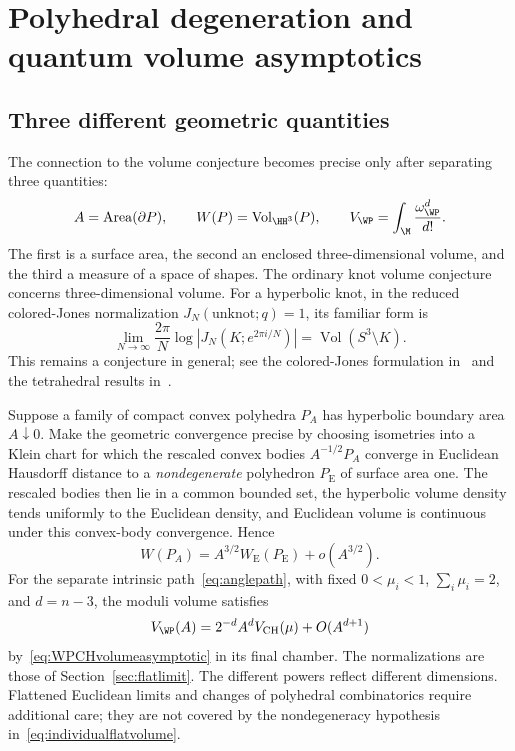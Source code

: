 \section{Polyhedral degeneration and quantum volume asymptotics}
\label{sec:quantumdegeneration}

\subsection{Three different geometric quantities}

The connection to the volume conjecture becomes precise only after
separating three quantities:
\[
 A=\operatorname{Area}(\partial P),\qquad
 W(P)=\operatorname{Vol}_{\HH^3}(P),\qquad
 V_{\WP}=\int_{\M}\frac{\omega_{\WP}^d}{d!}.
\]
The first is a surface area, the second an enclosed three-dimensional
volume, and the third a measure of a space of shapes. The ordinary
knot volume conjecture concerns three-dimensional volume. For a
hyperbolic knot, in the reduced colored-Jones normalization
$J_N(\text{unknot};q)=1$, its familiar form is
\begin{equation}
 \lim_{N\to\infty}\frac{2\pi}{N}
 \log\left|J_N(K;e^{2\pi i/N})\right|
 =\operatorname{Vol}(S^3\setminus K).
 \label{eq:volumeconjecture}
\end{equation}
This remains a conjecture in general; see the colored-Jones
formulation in~\cite{MurakamiMurakami} and the tetrahedral
results in~\cite{Costantino}.

Suppose a family of compact convex polyhedra $P_A$ has hyperbolic
boundary area $A\downarrow0$. Make the geometric convergence
precise by choosing isometries into a Klein chart for which the
rescaled convex bodies $A^{-1/2}P_A$ converge in Euclidean
Hausdorff distance to a \emph{nondegenerate} polyhedron
$P_{\mathrm E}$ of surface area one. The rescaled bodies then lie
in a common bounded set, the hyperbolic volume density tends
uniformly to the Euclidean density, and Euclidean volume is
continuous under this convex-body convergence. Hence
\begin{equation}
 W(P_A)=A^{3/2}W_{\mathrm E}(P_{\mathrm E})+o(A^{3/2}).
 \label{eq:individualflatvolume}
\end{equation}
For the separate intrinsic path~\eqref{eq:anglepath}, with fixed
$0<\mu_i<1$, $\sum_i\mu_i=2$, and $d=n-3$, the moduli volume
satisfies
\[
 V_{\WP}(A)=2^{-d}A^d V_{\mathrm{CH}}(\mu)+O(A^{d+1})
\]
by~\eqref{eq:WPCHvolumeasymptotic} in its final chamber. The
normalizations are those of Section~\ref{sec:flatlimit}.
The different powers reflect different dimensions. Flattened
Euclidean limits and changes of polyhedral combinatorics require
additional care; they are not covered by the nondegeneracy
hypothesis in~\eqref{eq:individualflatvolume}.


